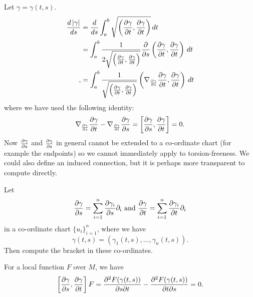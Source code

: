 Let $\gamma=\gamma(t,s)$.
\begin{align*}
  \frac{d\left\lvert \gamma \right\rvert}{ds} &= \frac{d}{ds} \int_a^b \sqrt{\left( \frac{\partial\gamma}{\partial t},\frac{\partial\gamma}{\partial t} \right)} \, dt \\
  &= \int_a^b \frac{1}{2\sqrt{\left( \frac{\partial\gamma}{\partial t},\frac{\partial\gamma}{\partial t} \right)}} \frac{\partial}{\partial s} \left( \frac{\partial\gamma}{\partial t},\frac{\partial\gamma}{\partial t} \right) \, dt \\,
  &= \int_a^b \frac{1}{\sqrt{\left( \frac{\partial\gamma}{\partial t},\frac{\partial\gamma}{\partial t} \right)}} \left( \nabla_{\frac{\partial\gamma}{\partial s}} \frac{\partial\gamma}{\partial t},\frac{\partial\gamma}{\partial t} \right) \, dt
\end{align*}
where we have used the following identity:
\[ \nabla_{\frac{\partial\gamma}{\partial s}}\frac{\partial\gamma}{\partial t} - \nabla_{\frac{\partial\gamma}{\partial t}}\frac{\partial\gamma}{\partial s} = \left[ \frac{\partial\gamma}{\partial s}, \frac{\partial\gamma}{\partial t} \right] = 0. \]
Now $\tfrac{\partial\gamma}{\partial s}$ and $\tfrac{\partial\gamma}{\partial s}$ in general cannot be extended to a co-ordinate chart (for example the endpoints) so we cannot immediately apply to torsion-freeness.
We could also define an induced connection, but it is perhaps more transparent to compute directly.

\begin{enum}
  \io
  Let
  \[ \frac{\partial\gamma}{\partial s} = \sum_{i=1}^n \frac{\partial\gamma_i}{\partial s}\partial_i \text{ and } \frac{\partial\gamma}{\partial t} = \sum_{i=1}^n \frac{\partial\gamma_i}{\partial t}\partial_i \] 
  in a co-ordinate chart $\{u_i\}_{i=1}^n$, where we have
  \[ \gamma(t,s) = \left( \gamma_1(t,s),\ldots,\gamma_n(t,s) \right). \]
  Then compute the bracket in these co-ordinates.

  \io
  For a local function $F$ over $M$, we have
  \[ \left[ \frac{\partial\gamma}{\partial s}, \frac{\partial\gamma}{\partial t} \right]F = \frac{\partial^2 F(\gamma(t,s))}{\partial s\partial t} - \frac{\partial^2F(\gamma(t,s))}{\partial t\partial s} = 0. \]
\end{enum}
